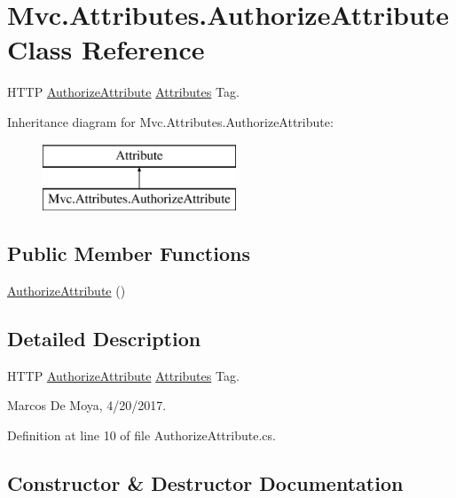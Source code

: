\hypertarget{class_mvc_1_1_attributes_1_1_authorize_attribute}{}\section{Mvc.\+Attributes.\+Authorize\+Attribute Class Reference}
\label{class_mvc_1_1_attributes_1_1_authorize_attribute}


H\+T\+TP \hyperlink{class_mvc_1_1_attributes_1_1_authorize_attribute}{Authorize\+Attribute} \hyperlink{namespace_mvc_1_1_attributes}{Attributes} Tag.  


Inheritance diagram for Mvc.\+Attributes.\+Authorize\+Attribute\+:\begin{figure}[H]
\begin{center}
\leavevmode
\includegraphics[height=2.000000cm]{class_mvc_1_1_attributes_1_1_authorize_attribute}
\end{center}
\end{figure}
\subsection*{Public Member Functions}
\begin{DoxyCompactItemize}
\item 
\hyperlink{class_mvc_1_1_attributes_1_1_authorize_attribute_a1626ecab5712246e4b4216e1a4883adf}{Authorize\+Attribute} ()
\end{DoxyCompactItemize}


\subsection{Detailed Description}
H\+T\+TP \hyperlink{class_mvc_1_1_attributes_1_1_authorize_attribute}{Authorize\+Attribute} \hyperlink{namespace_mvc_1_1_attributes}{Attributes} Tag. 

Marcos De Moya, 4/20/2017. 

Definition at line 10 of file Authorize\+Attribute.\+cs.



\subsection{Constructor \& Destructor Documentation}
\mbox{\label{class_mvc_1_1_attributes_1_1_authorize_attribute_a1626ecab5712246e4b4216e1a4883adf}} 
